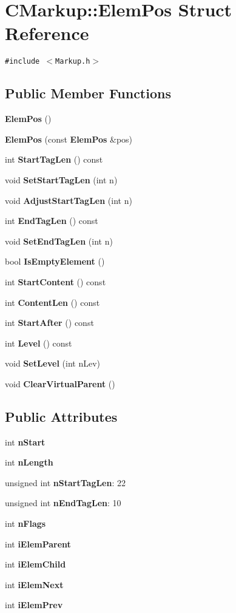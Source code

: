 \section{CMarkup::ElemPos Struct Reference}
\label{structCMarkup_1_1ElemPos}
{\tt \#include $<$Markup.h$>$}

\subsection*{Public Member Functions}
\begin{CompactItemize}
\item 
{\bf ElemPos} ()
\item 
{\bf ElemPos} (const {\bf ElemPos} \&pos)
\item 
int {\bf StartTagLen} () const 
\item 
void {\bf SetStartTagLen} (int n)
\item 
void {\bf AdjustStartTagLen} (int n)
\item 
int {\bf EndTagLen} () const 
\item 
void {\bf SetEndTagLen} (int n)
\item 
bool {\bf IsEmptyElement} ()
\item 
int {\bf StartContent} () const 
\item 
int {\bf ContentLen} () const 
\item 
int {\bf StartAfter} () const 
\item 
int {\bf Level} () const 
\item 
void {\bf SetLevel} (int nLev)
\item 
void {\bf ClearVirtualParent} ()
\end{CompactItemize}
\subsection*{Public Attributes}
\begin{CompactItemize}
\item 
int {\bf nStart}
\item 
int {\bf nLength}
\item 
unsigned int {\bf nStartTagLen}: 22
\item 
unsigned int {\bf nEndTagLen}: 10
\item 
int {\bf nFlags}
\item 
int {\bf iElemParent}
\item 
int {\bf iElemChild}
\item 
int {\bf iElemNext}
\item 
int {\bf iElemPrev}
\end{CompactItemize}



